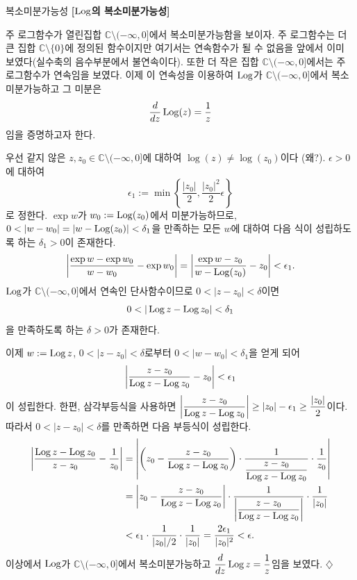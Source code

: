 \begin{saltexample}{복소미분가능성}{} \label{example-2-9}
\textbf{[$\mathop{\mathrm{Log}}$의 복소미분가능성]} %

주 로그함수가 열린집합 $\mathbb C \setminus(-\infty,0]$에서
복소미분가능함을 보이자.
주 로그함수는 더 큰 집합 $\mathbb C \setminus\{0\}$에 정의된 함수이지만
여기서는 연속함수가 될 수 없음을 앞에서 이미 보였다(실수축의 음수부분에서 불연속이다).
또한 더 작은 집합 $\mathbb C \setminus(-\infty,0]$에서는 주 로그함수가 연속임을 보였다.
이제 이 연속성을 이용하여 $\mathop{\mathrm{Log}}$가 $\mathbb C \setminus(-\infty,0]$에서
복소미분가능하고 그 미분은
\[
\displaystyle\frac{d}{dz} \mathop{\mathrm{Log}} (z) = \displaystyle\frac 1z 
\]
임을 증명하고자 한다.

우선 같지 않은 $z, z_0 \in \mathbb C \setminus(-\infty,0]$에 대하여
$\log (z) \ne \log(z_0)$이다 (왜?).
$\epsilon>0$에 대하여
\[
\epsilon_1 := \min \left\{ \dfrac{|z_0|}2, \dfrac{|z_0|^2}2\epsilon \right\}
\]
로 정한다.
$\exp w$가 $w_0:=\mathop{\mathrm{Log}}(z_0)$에서 미분가능하므로,
$0<|w-w_0| = |w - \Log(z_0)| < \delta_1$을 만족하는 모든 $w$에 대하여
다음 식이 성립하도록 하는 $\delta_1>0$이 존재한다.
\[
\left| \displaystyle\frac{\exp w - \exp w_0}{w-w_0} - \exp w_0 \right|
= \left| \displaystyle\frac{\exp w - z_0}{w - \mathop{\mathrm{Log}}(z_0)} - z_0 \right| <\epsilon_1.
\]
$\mathop{\mathrm{Log}}$가 $\mathbb C \setminus(-\infty,0]$에서
연속인 단사함수이므로
$0<|z-z_0|<\delta$이면 
\[
0 < |\mathop{\mathrm{Log}} z - \mathop{\mathrm{Log}} z_0 | < \delta_1
\]
을 만족하도록 하는 $\delta>0$가 존재한다.

이제 $w:=\mathop{\mathrm{Log}} z$, $0<|z-z_0|<\delta$로부터
$0<|w-w_0|<\delta_1$을 얻게 되어
\[
\left| \displaystyle\frac{z-z_0}{\mathop{\mathrm{Log}} z - \mathop{\mathrm{Log}} z_0} - z_0 \right| < \epsilon_1
\]
이 성립한다.
한편, 삼각부등식을 사용하면
$ \left| \displaystyle\frac{z-z_0}{\mathop{\mathrm{Log}} z - \mathop{\mathrm{Log}} z_0} \right| \ge |z_0| - \epsilon_1 
\ge \displaystyle\frac{|z_0|}2$이다.
따라서 
$0<|z-z_0|<\delta$를 만족하면 다음 부등식이 성립한다.
\begin{align*}
\left| \displaystyle\frac{\mathop{\mathrm{Log}} z - \mathop{\mathrm{Log}} z_0}{z-z_0} - \displaystyle\frac1{z_0} \right|
&= \left| \left(z_0 - \displaystyle\frac{z-z_0}{\mathop{\mathrm{Log}} z - \mathop{\mathrm{Log}} z_0} \right)\cdot
\displaystyle\frac1{\displaystyle\frac{z-z_0}{\mathop{\mathrm{Log}} z - \mathop{\mathrm{Log}} z_0}}\cdot \displaystyle\frac1{z_0} \right| \\
&= \left| z_0 - \displaystyle\frac{z-z_0}{\mathop{\mathrm{Log}} z - \mathop{\mathrm{Log}} z_0} \right| \cdot
\displaystyle\frac1{\left|\displaystyle\frac{z-z_0}{\mathop{\mathrm{Log}} z - \mathop{\mathrm{Log}} z_0}\right|} \cdot
\displaystyle\frac1{|z_0|} \\
&< \epsilon_1 \cdot \displaystyle\frac1{|z_0|/2}\cdot \displaystyle\frac1{|z_0|} 
= \displaystyle\frac{2\epsilon_1}{|z_0|^2} < \epsilon.
\end{align*}
이상에서 $\mathop{\mathrm{Log}}$가 $\mathbb C \setminus (-\infty,0]$에서 복소미분가능하고
$\displaystyle\frac{d}{dz}\mathop{\mathrm{Log}} z = \displaystyle\frac 1z$임을 보였다.
\hfill $\diamondsuit$
\end{saltexample}

